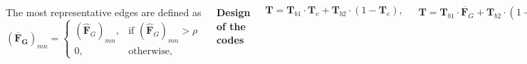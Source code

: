 \documentclass{beamer}
\begin{document}

\begin{frame}

\begin{columns}

\column{2.2in}
\scriptsize{The most representative edges are defined as}
\begin{equation*}
\mathbf{\left( \overline{F}_G\right) }_{mn} = 
\begin{cases} 
\left( \mathbf{\hat{F}}_{G} \right)_{mn}, & \mbox{if } \left( \mathbf{\hat{F}}_G \right)_{mn} > \rho \\ 
0, & \mbox{otherwise},
\end{cases}
\label{Eq:Fg}
\end{equation*}

\textbf{\scriptsize{Design of the codes}}

\begin{equation*}
\mathbf{T} = \mathbf{T}_{b1} \cdot \mathbf{T}_e + \mathbf{T}_{b2} \cdot (1-\mathbf{T}_e),
\label{Eq:T1}
\end{equation*}

\begin{equation*}
\mathbf{T} = \mathbf{T}_{b1} \cdot \mathbf{\overline{F}}_G + \mathbf{T}_{b2} \cdot (1-\mathbf{\overline{F}}_G).
\end{equation*}

\begin{itemize}
\item First component: Blue noise pattern (in order to achieve a more uniform sensing)
\item Second component: Edge component
\item $\mathbf{T}_{b1}\neq \mathbf{T}_{b2}$
\end{itemize}


\end{columns}
\end{frame}
\end{document}
